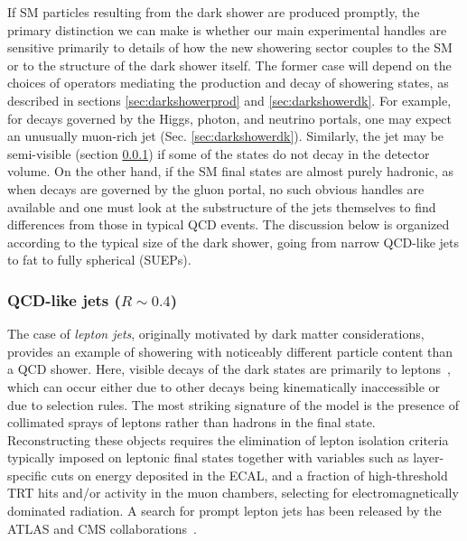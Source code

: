 If SM particles resulting from the dark shower are produced promptly, the primary distinction we can make is whether our main experimental handles are sensitive primarily to details of how the new showering sector couples to the SM or to the structure of the dark shower itself. 
The former case will depend on the
choices of operators mediating the production and decay of showering states, as described in sections \ref{sec:darkshowerprod} and \ref{sec:darkshowerdk}.
For example, for decays governed by the Higgs, photon, and neutrino portals, one may expect an unusually muon-rich jet (Sec. \ref{sec:darkshowerdk}). Similarly, the jet may be semi-visible (section \ref{sec:darkshowerthinjet}) if some of the states do not decay in the detector volume. On the other hand, if the SM final states are almost purely hadronic, as when decays are governed by the gluon portal, no such obvious handles are available and one must look at the substructure of the jets themselves to find differences from those in typical QCD events. The discussion below is organized according to the typical size of the dark shower, going from narrow QCD-like jets to fat to fully spherical (SUEPs).



%
\subsubsection{QCD-like jets ($R \sim 0.4$)} %
\label{sec:darkshowerthinjet}

The case of \emph{lepton jets}, originally motivated by dark matter considerations, provides an example of showering with noticeably different particle content than a QCD shower. Here, visible decays of the dark states are primarily to leptons~\cite{Falkowski:2010cm,Falkowski:2010gv}, which can occur either due to other decays being kinematically inaccessible or due to selection rules. The most striking signature of the model is the presence of collimated sprays of leptons rather than hadrons in the final state. Reconstructing these objects requires the elimination of lepton isolation criteria typically imposed on leptonic final states together with variables such as layer-specific cuts on energy deposited in the ECAL, and a fraction of high-threshold TRT hits and/or activity in the muon chambers, selecting for electromagnetically dominated radiation. A search for prompt lepton jets has been released by the ATLAS and CMS collaborations~\cite{Chatrchyan:2011hr,Aad:2015sms}.

